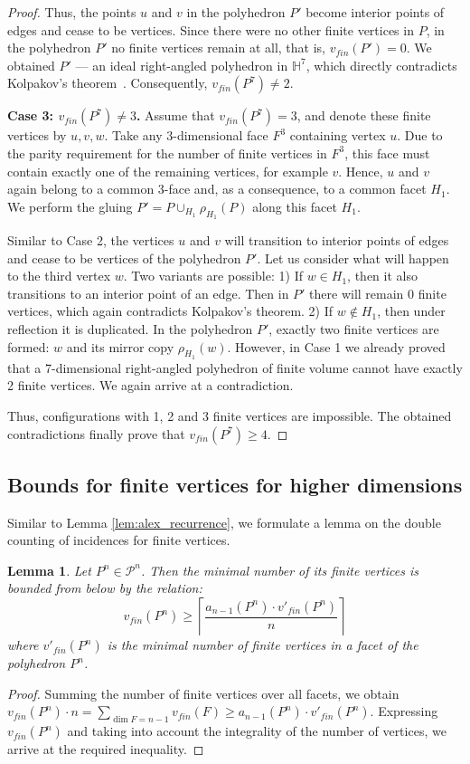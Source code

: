 \documentclass[12pt]{amsart}
\newtheorem{lemma}{Lemma}[section]
\theoremstyle{definition}
\begin{document}
\begin{proof}
		Thus, the points $u$ and $v$ in the polyhedron $P'$ become interior points of edges and cease to be vertices. Since there were no other finite vertices in $P$, in the polyhedron $P'$ no finite vertices remain at all, that is, $v_{fin}(P') = 0$. We obtained $P'$ — an ideal right-angled polyhedron in $\mathbb{H}^7$, which directly contradicts Kolpakov's theorem~\cite{Ko2012}. Consequently, $v_{fin}(P^7) \ne 2$.
		
		\textbf{Case 3: $v_{fin}(P^7) \ne 3$.}
		Assume that $v_{fin}(P^7) = 3$, and denote these finite vertices by $u, v, w$. Take any 3-dimensional face $F^3$ containing vertex $u$. Due to the parity requirement for the number of finite vertices in $F^3$, this face must contain exactly one of the remaining vertices, for example $v$. Hence, $u$ and $v$ again belong to a common 3-face and, as a consequence, to a common facet $H_1$. We perform the gluing $P' = P \cup_{H_1} \rho_{H_1}(P)$ along this facet $H_1$.
		
		Similar to Case 2, the vertices $u$ and $v$ will transition to interior points of edges and cease to be vertices of the polyhedron $P'$. Let us consider what will happen to the third vertex $w$. Two variants are possible:
		1) If $w \in H_1$, then it also transitions to an interior point of an edge. Then in $P'$ there will remain 0 finite vertices, which again contradicts Kolpakov's theorem.
		2) If $w \notin H_1$, then under reflection it is duplicated. In the polyhedron $P'$, exactly two finite vertices are formed: $w$ and its mirror copy $\rho_{H_1}(w)$. However, in Case 1 we already proved that a 7-dimensional right-angled polyhedron of finite volume cannot have exactly 2 finite vertices. We again arrive at a contradiction.
		
		Thus, configurations with 1, 2 and 3 finite vertices are impossible. The obtained contradictions finally prove that $v_{fin}(P^7) \ge 4$.
	\end{proof}
	
	\subsection{Bounds for finite vertices for higher dimensions}
	
	Similar to Lemma \ref{lem:alex_recurrence}, we formulate a lemma on the double counting of incidences for finite vertices.
	
	\begin{lemma} \label{lem:fin_recurrence}
		Let $P^n \in \mathcal{P}^n$. Then the minimal number of its finite vertices is bounded from below by the relation:
		$$v_{fin}(P^n) \ge \left\lceil \frac{a_{n-1}(P^n) \cdot v'_{fin}(P^n)}{n} \right\rceil$$
		where $v'_{fin}(P^n)$ is the minimal number of finite vertices in a facet of the polyhedron $P^n$.
	\end{lemma}
	\begin{proof}
		Summing the number of finite vertices over all facets, we obtain $v_{fin}(P^n) \cdot n = \sum_{\dim F = n-1} v_{fin}(F) \ge a_{n-1}(P^n) \cdot v'_{fin}(P^n)$. Expressing $v_{fin}(P^n)$ and taking into account the integrality of the number of vertices, we arrive at the required inequality.
	\end{proof}
	
\end{document}
